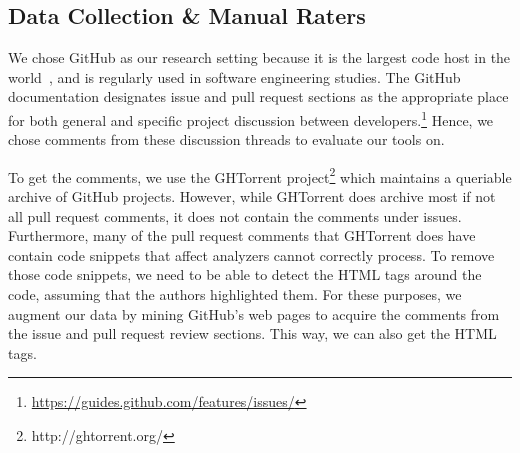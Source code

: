 \subsection{Data Collection \& Manual Raters}\label{data}

We chose GitHub as our research setting because it is the largest code host in 
the world~\cite{gousios2014lean}, and is regularly used in software 
engineering studies. The GitHub  documentation designates issue and pull request sections as the appropriate place for both general and specific project discussion between developers.\footnote{\url{https://guides.github.com/features/issues/}} Hence, we chose comments from these discussion threads to evaluate our tools on. 


To get the comments, we use the GHTorrent project\footnote{http://ghtorrent.org/} which maintains a queriable archive of GitHub projects. However, while GHTorrent does archive most if not all pull request comments, it does not contain the comments under issues. Furthermore, many of the pull request comments that GHTorrent does have contain code snippets that affect analyzers cannot correctly process. To remove those code snippets, we need to be able to detect the HTML tags around the code, assuming that the authors highlighted them. For these purposes, we augment our data by mining GitHub's web pages to acquire the comments from the issue and pull request review sections. This way, we can also get the HTML tags.

